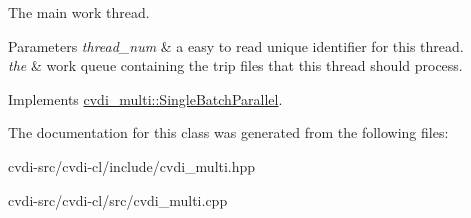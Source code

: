 The main work thread. 


\begin{DoxyParams}{Parameters}
{\em thread\+\_\+num} & a easy to read unique identifier for this thread. \\
\hline
{\em the} & work queue containing the trip files that this thread should process. \\
\hline
\end{DoxyParams}


Implements \hyperlink{classcvdi__multi_1_1SingleBatchParallel_a6514a89e14f2724ab671ffd65d7c43c7}{cvdi\+\_\+multi\+::\+Single\+Batch\+Parallel}.



The documentation for this class was generated from the following files\+:\begin{DoxyCompactItemize}
\item 
cvdi-\/src/cvdi-\/cl/include/cvdi\+\_\+multi.\+hpp\item 
cvdi-\/src/cvdi-\/cl/src/cvdi\+\_\+multi.\+cpp\end{DoxyCompactItemize}

